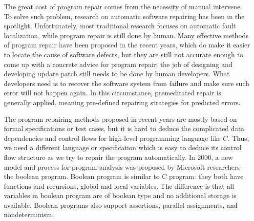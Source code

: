 The great cost of program repair comes from the necessity of manual intervene\cite{SFTiaCA:TaRM}.
To solve such problem, research on automatic software repairing has been in the spotlight.
Unfortunately, most traditional research focuses on automatic fault localization, while program repair is still done by human.
Many effective methods of program repair have been proposed in the recent years, which do make it easier to locate the cause of software defects, but they are still not accurate enough to come up with a concrete advice for program repair: the job of designing and developing update patch still needs to be done by human developers.
What developers need is to recover the software system from failure and make sure such error will not happen again\cite{MBAfSHS}. In this circumstance, premeditated repair is generally applied, meaning pre-defined repairing strategies for predicted errors.

The program repairing methods proposed in recent years are mostly based on formal specifications or test cases, but it is hard to deduce the complicated data dependencies and control flows for high-level programming language like $C$.
Thus, we need a different language or specification which is easy to deduce its control flow structure as we try to repair the program automatically.
In 2000, a new model and process for program analysis was proposed by Microsoft researchers -- the boolean program\cite{BP:aMaPfSA}.
Boolean program is similar to C program: they both have functions and recursions, global and local variables\cite{Bb:aSMCfBP}.
The difference is that all variables in boolean program are of boolean type and no additional storage is available.
Boolean programs also support assertions, parallel assignments, and nondeterminism.


